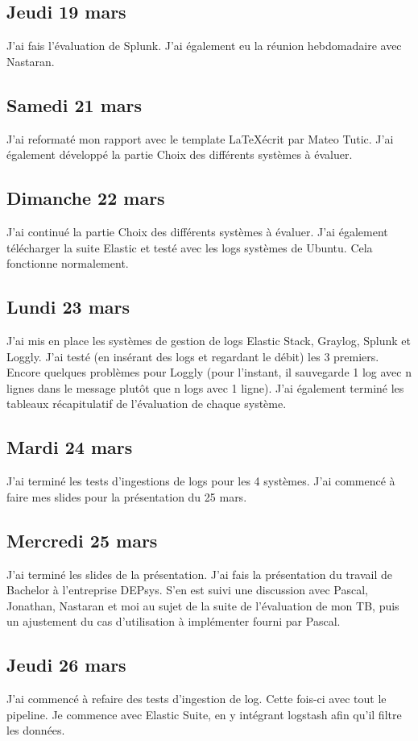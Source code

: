 \documentclass[paper=a4, fontsize=11pt]{scrartcl}
\begin{document}
\subsection{Jeudi 19 mars}
    J'ai fais l'évaluation de Splunk. J'ai également eu la réunion hebdomadaire avec Nastaran.
\subsection{Samedi 21 mars}
    J'ai reformaté mon rapport avec le template \LaTeX écrit par Mateo Tutic. J'ai également développé la partie Choix des différents systèmes à évaluer.
\subsection{Dimanche 22 mars}
    J'ai continué la partie Choix des différents systèmes à évaluer. J'ai également télécharger la suite Elastic et testé avec les logs systèmes de Ubuntu. Cela fonctionne normalement.
\subsection{Lundi 23 mars}
    J'ai mis en place les systèmes de gestion de logs Elastic Stack, Graylog, Splunk et Loggly. J'ai testé (en insérant des logs et regardant le débit) les 3 premiers. Encore quelques problèmes pour Loggly (pour l'instant, il sauvegarde 1 log avec n lignes dans le message plutôt que n logs avec 1 ligne). J'ai également terminé les tableaux récapitulatif de l'évaluation de chaque système.
\subsection{Mardi 24 mars}
    J'ai terminé les tests d'ingestions de logs pour les 4 systèmes. J'ai commencé à faire mes slides pour la présentation du 25 mars.
\subsection{Mercredi 25 mars}
    J'ai terminé les slides de la présentation. J'ai fais la présentation du travail de Bachelor à l'entreprise DEPsys. S'en est suivi une discussion avec Pascal, Jonathan, Nastaran et moi au sujet de la suite de l'évaluation de mon TB, puis un ajustement du cas d'utilisation à implémenter fourni par Pascal.
\subsection{Jeudi 26 mars}
    J'ai commencé à refaire des tests d'ingestion de log. Cette fois-ci avec tout le pipeline. Je commence avec Elastic Suite, en y intégrant logstash afin qu'il filtre les données.
\end{document}

